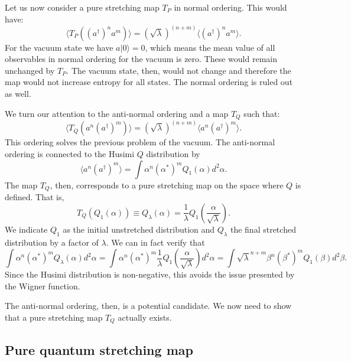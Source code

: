 \documentclass{article}
\begin{document}
Let us now consider a pure stretching map $T_P$ in normal ordering. This would have:
\begin{equation}
\langle T_P((a^\dagger)^n a^m) \rangle = (\sqrt{\lambda})^{(n+m)} \langle (a^\dagger)^n a^m \rangle.
\end{equation}
For the vacuum state we have $a|0\rangle=0$, which means the mean value of all observables in normal ordering for the vacuum is zero. These would remain unchanged by $T_P$. The vacuum state, then, would not change and therefore the map would not increase entropy for all states. The normal ordering is ruled out as well.

We turn our attention to the anti-normal ordering and a map $T_Q$ such that:
\begin{equation}
\langle T_Q(a^n(a^\dagger)^m) \rangle = (\sqrt{\lambda})^{(n+m)} \langle a^n(a^\dagger)^m \rangle.
\end{equation}
This ordering solves the previous problem of the vacuum. The anti-normal ordering is connected to the Husimi $Q$ distribution by
\begin{equation}
    \langle a^n (a^\dagger)^m\rangle=\int \alpha^n(\alpha^*)^m Q_1(\alpha)d^2\alpha.
\end{equation}
The map $T_Q$, then, corresponds to a pure stretching map on the space where $Q$ is defined. That is,
\begin{equation}
T_Q(Q_1(\alpha)) \equiv Q_\lambda(\alpha) = \frac{1}{\lambda}Q_1\left(\frac{\alpha}{\sqrt{\lambda}}\right).
\end{equation}
We indicate $Q_1$ as the initial unstretched distribution and $Q_\lambda$ the final stretched distribution by a factor of $\lambda$. We can in fact verify that 
\begin{equation}
\int \alpha^n(\alpha^*)^m Q_\lambda(\alpha)d^2\alpha=\int \alpha^n(\alpha^*)^m \frac{1}{\lambda}Q_1\left(\frac{\alpha}{\sqrt{\lambda}}\right)d^2\alpha=\int \sqrt{\lambda}^{n+m}\beta^n(\beta^*)^m Q_1(\beta)d^2\beta.
\end{equation}
Since the Husimi distribution is non-negative, this avoids the issue presented by the Wigner function.

The anti-normal ordering, then, is a potential candidate. We now need to show that a pure stretching map $T_Q$ actually exists.

\subsection{Pure quantum stretching map}
\end{document}
